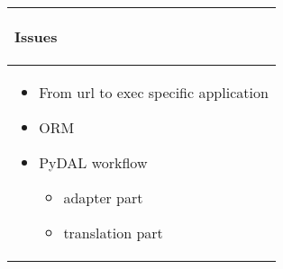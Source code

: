 \documentclass{article}
\begin{document}
\begin{longtable}{|p{\textwidth}|}
\hline
\rowcolor{background}
\begin{center}
\vspace{-1.5em}\textbf{Issues}\vspace{-1em}
\end{center} \\
\hline
\endhead
\begin{itemize}
    \item From url to exec specific application
    \item ORM
    \item PyDAL workflow
    \begin{itemize}
        \item adapter part
        \item translation part 
    \end{itemize}
\end{itemize}\\
\hline
\end{longtable}
\end{document}
